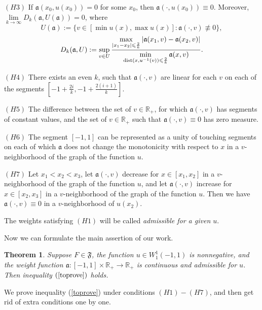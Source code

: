 \documentclass[12pt]{article}
\newcommand{\Real}{\mathbb R}
\newcommand{\abs}[1]{\left\vert#1\right\vert}
\renewcommand{\le}{\leqslant}
\newtheorem{thm}{Theorem}
\newcommand{\W}{W_1^1}
\newcommand{\dist}{\mathop{\rm dist}\nolimits}
\begin{document}
\bigskip
\noindent
$(H3)$ If $\mathfrak a(x_0, u(x_0)) = 0$ for some $x_0$, then $\mathfrak a(\cdot, u(x_0)) \equiv 0$.
Moreover, $\lim\limits_{k \to \infty} D_k(\mathfrak a, U(\mathfrak a)) = 0$, where
$$U(\mathfrak a) := \{ v \in [\min u(x), \max u(x)]: \mathfrak a(\cdot, v) \not \equiv 0 \},$$
\begin{equation}
\label{bigD}
D_k(\mathfrak a, U): = \sup \limits_{v \in U}
\frac{\max \limits_{\abs{x_1 - x_2} \le \frac{2}{k}} \abs{\mathfrak a(x_1, v) - \mathfrak a(x_2, v)}}
{\min \limits_{\dist (x, u^{-1} (v)) \le \frac{2}{k}} \mathfrak a(x, v)}.
\end{equation}

\bigskip
\noindent
$(H4)$ There exists an even $k$, such that $\mathfrak a(\cdot, v)$ are linear for each $v$ on each of the segments
$[-1 + \frac{2i}{k}, -1 + \frac{2(i + 1)}{k}]$.

\bigskip
\noindent
$(H5)$ The difference between the
set of $v \in \Real_+$, for which $\mathfrak a(\cdot, v)$ has segments of constant values,
and the set of $v \in \Real_+$ such that $\mathfrak a(\cdot, v) \equiv 0$
has zero measure.

\bigskip
\noindent
$(H6)$ The segment $[-1, 1]$ can be represented as a unity of touching segments
on each of which $\mathfrak a$ does not change the monotonicity with respect to $x$ in a $v$-neighborhood of the graph of the function $u$.

\bigskip
\noindent
$(H7)$ Let $x_1 < x_2 < x_3$,
let $\mathfrak a(\cdot, v)$ decrease for $x \in [x_1, x_2]$ in a $v$-neighborhood of the graph of the function $u$,
and let $\mathfrak a(\cdot, v)$ increase for $x \in [x_2, x_3]$ in a $v$-neighborhood of the graph of the function $u$.
Then we have $\mathfrak a(\cdot, v) \equiv 0$ in a $v$-neighborhood of $u(x_2)$.

\bigskip

The weights satisfying $(H1)$ will be called {\it admissible for a given $u$}.

\medskip

Now we can formulate the main assertion of our work.
\begin{thm}
\label{mainThm}
Suppose $F \in \mathfrak{F}$, the function $u \in \W(-1, 1)$ is nonnegative,
and the weight function $\mathfrak a: [-1, 1] \times \Real_+ \to \Real_+$ is continuous
and admissible for $u$.
Then inequality $(\ref{toprove})$ holds.
\end{thm}

We prove inequality (\ref{toprove}) under conditions $(H1)-(H7)$,
and then get rid of extra conditions one by one.
\end{document}

